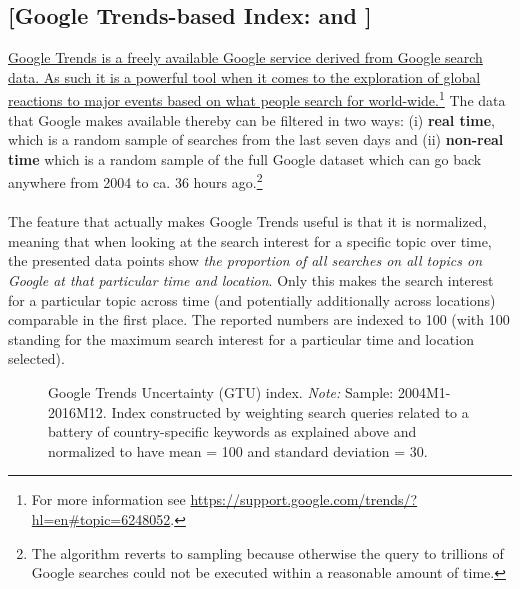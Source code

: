 \documentclass[a4paper,12pt,oneside,pointednumbers,bibtotoc,bigheadings,liststotoc]{scrbook}
\begin{document}
\subsection{[Google Trends-based Index: \citet{bontempietal:16} and \citet{castelnuovoandtran:17}]}
\label{sec:googletrends}
\href{https://medium.com/google-news-lab/what-is-google-trends-data-and-what-does-it-mean-b48f07342ee8}{Google Trends is a freely available Google service derived from Google search data. As such it is a powerful tool when it comes to the exploration of global reactions to major events based on what people search for world-wide.}\footnote{For more information see \url{https://support.google.com/trends/?hl=en\#topic=6248052}.} The data that Google makes available thereby can be filtered in two ways: (i) \textbf{real time}, which is a random sample of searches from the last seven days and (ii) \textbf{non-real time} which is a random sample of the full Google dataset which can go back anywhere from 2004 to ca. 36 hours ago.\footnote{The algorithm reverts to sampling because otherwise the query to trillions of Google searches could not be executed within a reasonable amount of time.} 
\\
\\
The feature that actually makes Google Trends useful is that it is normalized, meaning that when looking at the search interest for a specific topic over time, the presented data points show \textit{the proportion of all searches on all topics on Google at that particular time and location}. Only this makes the search interest for a particular topic across time (and potentially additionally across locations) comparable in the first place. The reported numbers are indexed to 100 (with 100 standing for the maximum search interest for a particular time and location selected).

\begin{figure}[h]
   \centering
   \setlength\fboxsep{0pt}
   \setlength\fboxrule{0pt}
      \caption[Google Trends Uncertainty (GTU) index.]{Google Trends Uncertainty (GTU) index.
      \textit{Note:} Sample: 2004M1-2016M12. Index constructed by weighting search queries related to a battery of country-specific keywords as explained above and normalized to have mean = 100 and standard deviation = 30.}   \label{fig:gtuindex}
\end{figure}
\end{document}
